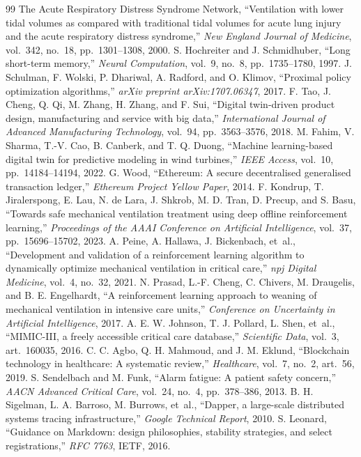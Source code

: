 \documentclass[12pt,a4paper,oneside]{report}
\begin{document}
\renewcommand{\bibname}{\centering BIBLIOGRAPHY}
\begin{thebibliography}{99}
 The Acute Respiratory Distress Syndrome Network, ``Ventilation with lower tidal volumes as compared with traditional tidal volumes for acute lung injury and the acute respiratory distress syndrome,'' \textit{New England Journal of Medicine}, vol.~342, no.~18, pp.~1301--1308, 2000.
 S. Hochreiter and J. Schmidhuber, ``Long short-term memory,'' \textit{Neural Computation}, vol.~9, no.~8, pp.~1735--1780, 1997.
 J. Schulman, F. Wolski, P. Dhariwal, A. Radford, and O. Klimov, ``Proximal policy optimization algorithms,'' \textit{arXiv preprint arXiv:1707.06347}, 2017.
 F. Tao, J. Cheng, Q. Qi, M. Zhang, H. Zhang, and F. Sui, ``Digital twin-driven product design, manufacturing and service with big data,'' \textit{International Journal of Advanced Manufacturing Technology}, vol.~94, pp.~3563--3576, 2018.
 M. Fahim, V. Sharma, T.-V. Cao, B. Canberk, and T. Q. Duong, ``Machine learning-based digital twin for predictive modeling in wind turbines,'' \textit{IEEE Access}, vol.~10, pp.~14184--14194, 2022.
 G. Wood, ``Ethereum: A secure decentralised generalised transaction ledger,'' \textit{Ethereum Project Yellow Paper}, 2014.
 F. Kondrup, T. Jiralerspong, E. Lau, N. de Lara, J. Shkrob, M. D. Tran, D. Precup, and S. Basu, ``Towards safe mechanical ventilation treatment using deep offline reinforcement learning,'' \textit{Proceedings of the AAAI Conference on Artificial Intelligence}, vol.~37, pp.~15696--15702, 2023.
 A. Peine, A. Hallawa, J. Bickenbach, et~al., ``Development and validation of a reinforcement learning algorithm to dynamically optimize mechanical ventilation in critical care,'' \textit{npj Digital Medicine}, vol.~4, no.~32, 2021.
 N. Prasad, L.-F. Cheng, C. Chivers, M. Draugelis, and B. E. Engelhardt, ``A reinforcement learning approach to weaning of mechanical ventilation in intensive care units,'' \textit{Conference on Uncertainty in Artificial Intelligence}, 2017.
 A. E. W. Johnson, T. J. Pollard, L. Shen, et~al., ``MIMIC-III, a freely accessible critical care database,'' \textit{Scientific Data}, vol.~3, art.~160035, 2016.
 C. C. Agbo, Q. H. Mahmoud, and J. M. Eklund, ``Blockchain technology in healthcare: A systematic review,'' \textit{Healthcare}, vol.~7, no.~2, art.~56, 2019.
 S. Sendelbach and M. Funk, ``Alarm fatigue: A patient safety concern,'' \textit{AACN Advanced Critical Care}, vol.~24, no.~4, pp.~378--386, 2013.
 B. H. Sigelman, L. A. Barroso, M. Burrows, et~al., ``Dapper, a large-scale distributed systems tracing infrastructure,'' \textit{Google Technical Report}, 2010.
 S. Leonard, ``Guidance on Markdown: design philosophies, stability strategies, and select registrations,'' \textit{RFC 7763}, IETF, 2016.
\end{thebibliography}
\end{document}
